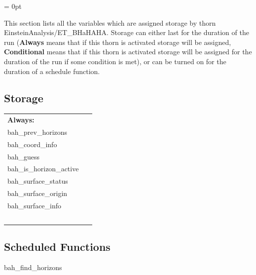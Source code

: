 \documentclass[a4paper,11pt]{article}
\begin{document}
\parskip = 0pt


\noindent This section lists all the variables which are assigned storage by thorn EinsteinAnalysis/ET\_BHaHAHA.  Storage can either last for the duration of the run ({\bf Always} means that if this thorn is activated storage will be assigned, {\bf Conditional} means that if this thorn is activated storage will be assigned for the duration of the run if some condition is met), or can be turned on for the duration of a schedule function.


\subsection*{Storage}

\hspace{5mm}

 \begin{tabular*}{160mm}{ll} 

{\bf Always:}&  ~ \\ 
 bah\_prev\_horizons & ~\\ 
 bah\_coord\_info & ~\\ 
 bah\_guess & ~\\ 
 bah\_is\_horizon\_active & ~\\ 
 bah\_surface\_status & ~\\ 
 bah\_surface\_origin & ~\\ 
 bah\_surface\_info & ~\\ 
~ & ~\\ 
\end{tabular*} 


\subsection*{Scheduled Functions}
\vspace{5mm}


\hspace{5mm} bah\_find\_horizons 

\hspace{5mm}{\it driver function for bhahaha } 


\hspace{5mm}
\end{document}
